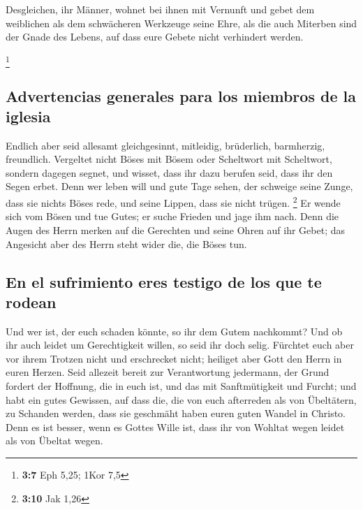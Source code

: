  Desgleichen, ihr Männer, wohnet bei ihnen mit Vernunft
und gebet dem weiblichen als dem schwächeren Werkzeuge seine Ehre, als
die auch Miterben sind der Gnade des Lebens, auf dass eure Gebete nicht
verhindert werden.

\footnote{\textbf{3:7} Eph 5,25; 1Kor 7,5}

\hypertarget{advertencias-generales-para-los-miembros-de-la-iglesia}{%
\subsection{Advertencias generales para los miembros de la
iglesia}\label{advertencias-generales-para-los-miembros-de-la-iglesia}}

 Endlich aber seid allesamt gleichgesinnt, mitleidig,
brüderlich, barmherzig, freundlich.  Vergeltet nicht Böses
mit Bösem oder Scheltwort mit Scheltwort, sondern dagegen segnet, und
wisset, dass ihr dazu berufen seid, dass ihr den Segen erbet.
 Denn wer leben will und gute Tage sehen, der schweige
seine Zunge, dass sie nichts Böses rede, und seine Lippen, dass sie
nicht trügen. \footnote{\textbf{3:10} Jak 1,26}  Er wende
sich vom Bösen und tue Gutes; er suche Frieden und jage ihm nach.
 Denn die Augen des Herrn merken auf die Gerechten und
seine Ohren auf ihr Gebet; das Angesicht aber des Herrn steht wider die,
die Böses tun.

\hypertarget{en-el-sufrimiento-eres-testigo-de-los-que-te-rodean}{%
\subsection{En el sufrimiento eres testigo de los que te
rodean}\label{en-el-sufrimiento-eres-testigo-de-los-que-te-rodean}}

 Und wer ist, der euch schaden könnte, so ihr dem Gutem
nachkommt?  Und ob ihr auch leidet um Gerechtigkeit
willen, so seid ihr doch selig. Fürchtet euch aber vor ihrem Trotzen
nicht und erschrecket nicht;  heiliget aber Gott den
Herrn in euren Herzen. Seid allezeit bereit zur Verantwortung jedermann,
der Grund fordert der Hoffnung, die in euch ist,  und das
mit Sanftmütigkeit und Furcht; und habt ein gutes Gewissen, auf dass
die, die von euch afterreden als von Übeltätern, zu Schanden werden,
dass sie geschmäht haben euren guten Wandel in Christo. 
Denn es ist besser, wenn es Gottes Wille ist, dass ihr von Wohltat wegen
leidet als von Übeltat wegen.

